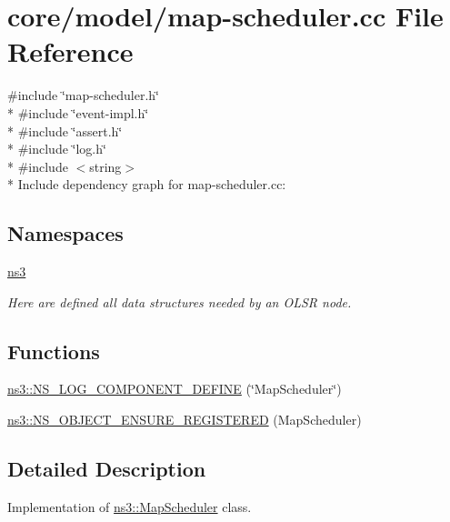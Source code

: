 \hypertarget{map-scheduler_8cc}{}\section{core/model/map-\/scheduler.cc File Reference}
\label{map-scheduler_8cc}
{\ttfamily \#include \char`\"{}map-\/scheduler.\+h\char`\"{}}\\*
{\ttfamily \#include \char`\"{}event-\/impl.\+h\char`\"{}}\\*
{\ttfamily \#include \char`\"{}assert.\+h\char`\"{}}\\*
{\ttfamily \#include \char`\"{}log.\+h\char`\"{}}\\*
{\ttfamily \#include $<$string$>$}\\*
Include dependency graph for map-\/scheduler.cc\+:
\subsection*{Namespaces}
\begin{DoxyCompactItemize}
\item 
 \hyperlink{namespacens3}{ns3}
\begin{DoxyCompactList}\small\item\em Here are defined all data structures needed by an O\+L\+SR node. \end{DoxyCompactList}\end{DoxyCompactItemize}
\subsection*{Functions}
\begin{DoxyCompactItemize}
\item 
\hyperlink{namespacens3_a5ac9fbef5036b218ba5598167c030467}{ns3\+::\+N\+S\+\_\+\+L\+O\+G\+\_\+\+C\+O\+M\+P\+O\+N\+E\+N\+T\+\_\+\+D\+E\+F\+I\+NE} (\char`\"{}Map\+Scheduler\char`\"{})
\item 
\hyperlink{namespacens3_afdc1c06f0ca7d6a8695563736cf618e1}{ns3\+::\+N\+S\+\_\+\+O\+B\+J\+E\+C\+T\+\_\+\+E\+N\+S\+U\+R\+E\+\_\+\+R\+E\+G\+I\+S\+T\+E\+R\+ED} (Map\+Scheduler)
\end{DoxyCompactItemize}


\subsection{Detailed Description}
Implementation of \hyperlink{classns3_1_1MapScheduler}{ns3\+::\+Map\+Scheduler} class. 